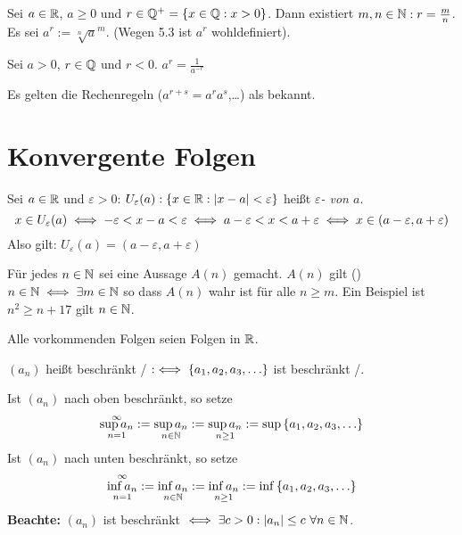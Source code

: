 \documentclass[a4paper,oneside,DIV15,BCOR12mm]{scrbook}
\begin{document}
\begin{definition}
\begin{liste}
\item Sei $a \in \mathbb{R}$, $a \ge 0 $ und $r \in \mathbb{Q}^+ = \{ x \in \mathbb{Q}: x>0\}$. Dann existiert $m,n \in \mathbb{N}: r = \frac{m}{n}$.  Es sei $a^r := \sqrt[n]{a}^m$. (Wegen 5.3 ist $a^r$ wohldefiniert).
\item Sei $a>0$, $r\in\mathbb{Q}$ und $r < 0$. $a^r = \frac{1}{a^{-r}} $
\end{liste}
\end{definition}

Es gelten die Rechenregeln ($a^{r+s} = a^r a^s$,\ldots) als bekannt.

\chapter{Konvergente Folgen}

\begin{definition}[Umgebung]
Sei $a \in \mathbb{R}$ und $\varepsilon > 0$: $U_\varepsilon(a):\{x \in \mathbb{R}: |x-a|<\varepsilon\}$ heißt \textit{$\varepsilon$- von $a$}. \\
$$ x \in U_\varepsilon(a) \iff -\varepsilon < x - a < \varepsilon \iff a - \varepsilon < x < a +  \varepsilon \iff x \in (a-\varepsilon, a+\varepsilon) $$
Also gilt: $U_\varepsilon(a) = (a-\varepsilon, a+\varepsilon)$
\end{definition}

\begin{definition}
Für jedes $n \in \mathbb{N}$ sei eine Aussage $A(n)$ gemacht. $A(n)$ gilt  (\ffa) $n \in \mathbb{N} \iff \exists m \in \mathbb{N} $ so dass $A(n)$ wahr ist für alle $n \ge m$. Ein Beispiel ist $n^2\ge n + 17$ gilt \ffa $n \in \mathbb{N}$.
\end{definition}

\begin{vereinbarung}
Alle vorkommenden Folgen seien Folgen in $\mathbb{R}$.
\end{vereinbarung}

\begin{definition}
$(a_n)$ heißt beschränkt / $:\iff \{a_1,a_2,a_3,\ldots\}$ ist beschränkt /.

Ist $(a_n)$ nach oben beschränkt, so setze
$$ \mathop{\sup{a_n}}_{n=1}^{\infty} := \mathop{\sup{a_n}}_{n\in \mathbb{N}} := \mathop{\sup{a_n}}_{n \ge 1} := \sup{\{a_1,a_2,a_3,\ldots\}}$$
Ist $(a_n)$ nach unten beschränkt, so setze
$$ \mathop{\inf{a_n}}_{n=1}^{\infty} := \mathop{\inf{a_n}}_{n\in \mathbb{N}} := \mathop{\inf{a_n}}_{n \ge 1} := \inf{\{a_1,a_2,a_3,\ldots\}}$$
\textbf{Beachte:} $(a_n)$ ist beschränkt $\iff \exists c > 0 : |a_n| \le c \ \forall n \in \mathbb{N}$.
\end{definition}
\end{document}
